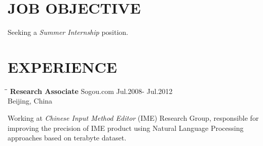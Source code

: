 \documentclass{res}
\begin{document}
 


\address{jianfeng.jia@gmail.com (949) 678-9893}
                                  
\begin{resume}

\section{JOB OBJECTIVE}          
    Seeking a \emph{Summer Internship} position.

\section{EXPERIENCE}
   \vspace{-0.1in}	
   \begin{tabbing}
   \hspace{2.5in}\= \hspace{3in}\= \kill %
    {\bf Research Associate} \>Sogou.com     \>Jul.2008- Jul.2012\\
                             \>Beijing, China
   \end{tabbing}\vspace{-20pt}      %
   Working at \emph{Chinese Input Method Editor} (IME) Research Group,
    responsible for improving the precision of IME product using Natural Language Processing approaches based on terabyte dataset. 


\end{resume}
\end{document}
